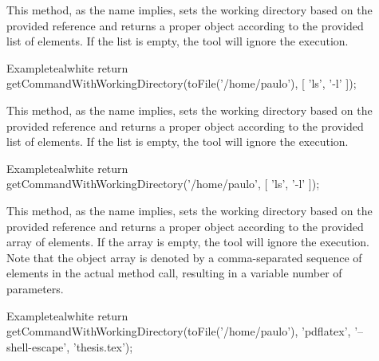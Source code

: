 \begin{description}
\item[] This method, as the name implies, sets the working directory based on the provided  reference and returns a proper  object according to the provided list of  elements. If the list is empty, the tool will ignore the execution.

\begin{codebox}{Example}{teal}{\icnote}{white}
return getCommandWithWorkingDirectory(toFile('/home/paulo'),
       [ 'ls', '-l' ]);
\end{codebox}

\item[] This method, as the name implies, sets the working directory based on the provided  reference and returns a proper  object according to the provided list of  elements. If the list is empty, the tool will ignore the execution.

\begin{codebox}{Example}{teal}{\icnote}{white}
return getCommandWithWorkingDirectory('/home/paulo',
       [ 'ls', '-l' ]);
\end{codebox}

\item[] This method, as the name implies, sets the working directory based on the provided  reference and returns a proper  object according to the provided array of  elements. If the array is empty, the tool will ignore the execution. Note that the object array is denoted by a comma-separated sequence of elements in the actual method call, resulting in a variable number of parameters.

\begin{codebox}{Example}{teal}{\icnote}{white}
return getCommandWithWorkingDirectory(toFile('/home/paulo'),
       'pdflatex', '--shell-escape', 'thesis.tex');
\end{codebox}


\end{description}
